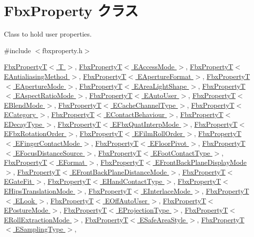 \hypertarget{class_fbx_property}{}\section{Fbx\+Property クラス}
\label{class_fbx_property}


Class to hold user properties.  




{\ttfamily \#include $<$fbxproperty.\+h$>$}



\hyperlink{class_fbx_property_t}{Fbx\+Property\+T$<$ T $>$}, \hyperlink{class_fbx_property_t}{Fbx\+Property\+T$<$ E\+Access\+Mode $>$}, \hyperlink{class_fbx_property_t}{Fbx\+Property\+T$<$ E\+Antialiasing\+Method $>$}, \hyperlink{class_fbx_property_t}{Fbx\+Property\+T$<$ E\+Aperture\+Format $>$}, \hyperlink{class_fbx_property_t}{Fbx\+Property\+T$<$ E\+Aperture\+Mode $>$}, \hyperlink{class_fbx_property_t}{Fbx\+Property\+T$<$ E\+Area\+Light\+Shape $>$}, \hyperlink{class_fbx_property_t}{Fbx\+Property\+T$<$ E\+Aspect\+Ratio\+Mode $>$}, \hyperlink{class_fbx_property_t}{Fbx\+Property\+T$<$ E\+Auto\+User $>$}, \hyperlink{class_fbx_property_t}{Fbx\+Property\+T$<$ E\+Blend\+Mode $>$}, \hyperlink{class_fbx_property_t}{Fbx\+Property\+T$<$ E\+Cache\+Channel\+Type $>$}, \hyperlink{class_fbx_property_t}{Fbx\+Property\+T$<$ E\+Category $>$}, \hyperlink{class_fbx_property_t}{Fbx\+Property\+T$<$ E\+Contact\+Behaviour $>$}, \hyperlink{class_fbx_property_t}{Fbx\+Property\+T$<$ E\+Decay\+Type $>$}, \hyperlink{class_fbx_property_t}{Fbx\+Property\+T$<$ E\+Fbx\+Quat\+Interp\+Mode $>$}, \hyperlink{class_fbx_property_t}{Fbx\+Property\+T$<$ E\+Fbx\+Rotation\+Order $>$}, \hyperlink{class_fbx_property_t}{Fbx\+Property\+T$<$ E\+Film\+Roll\+Order $>$}, \hyperlink{class_fbx_property_t}{Fbx\+Property\+T$<$ E\+Finger\+Contact\+Mode $>$}, \hyperlink{class_fbx_property_t}{Fbx\+Property\+T$<$ E\+Floor\+Pivot $>$}, \hyperlink{class_fbx_property_t}{Fbx\+Property\+T$<$ E\+Focus\+Distance\+Source $>$}, \hyperlink{class_fbx_property_t}{Fbx\+Property\+T$<$ E\+Foot\+Contact\+Type $>$}, \hyperlink{class_fbx_property_t}{Fbx\+Property\+T$<$ E\+Format $>$}, \hyperlink{class_fbx_property_t}{Fbx\+Property\+T$<$ E\+Front\+Back\+Plane\+Display\+Mode $>$}, \hyperlink{class_fbx_property_t}{Fbx\+Property\+T$<$ E\+Front\+Back\+Plane\+Distance\+Mode $>$}, \hyperlink{class_fbx_property_t}{Fbx\+Property\+T$<$ E\+Gate\+Fit $>$}, \hyperlink{class_fbx_property_t}{Fbx\+Property\+T$<$ E\+Hand\+Contact\+Type $>$}, \hyperlink{class_fbx_property_t}{Fbx\+Property\+T$<$ E\+Hips\+Translation\+Mode $>$}, \hyperlink{class_fbx_property_t}{Fbx\+Property\+T$<$ E\+Interlace\+Mode $>$}, \hyperlink{class_fbx_property_t}{Fbx\+Property\+T$<$ E\+Look $>$}, \hyperlink{class_fbx_property_t}{Fbx\+Property\+T$<$ E\+Off\+Auto\+User $>$}, \hyperlink{class_fbx_property_t}{Fbx\+Property\+T$<$ E\+Posture\+Mode $>$}, \hyperlink{class_fbx_property_t}{Fbx\+Property\+T$<$ E\+Projection\+Type $>$}, \hyperlink{class_fbx_property_t}{Fbx\+Property\+T$<$ E\+Roll\+Extraction\+Mode $>$}, \hyperlink{class_fbx_property_t}{Fbx\+Property\+T$<$ E\+Safe\+Area\+Style $>$}, \hyperlink{class_fbx_property_t}{Fbx\+Property\+T$<$ E\+Sampling\+Type $>$}, 